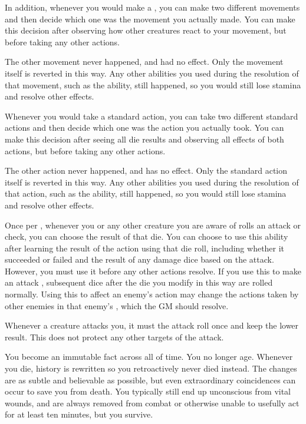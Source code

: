       In addition, whenever you would make a , you can make two different movements and then decide which one was the movement you actually made.
      You can make this decision after observing how other creatures react to your movement, but before taking any other actions.

      The other movement never happened, and had no effect.
      Only the movement itself is reverted in this way.
      Any other abilities you used during the resolution of that movement, such as the  ability, still happened, so you would still lose stamina and resolve other effects.

       Whenever you would take a standard action, you can take two different standard actions and then decide which one was the action you actually took.
      You can make this decision after seeing all die results and observing all effects of both actions, but before taking any other actions.

      The other action never happened, and has no effect.
      Only the standard action itself is reverted in this way.
      Any other abilities you used during the resolution of that action, such as the  ability, still happened, so you would still lose stamina and resolve other effects.

       Once per , whenever you or any other creature you are aware of rolls an attack or check, you can choose the result of that die.
      You can choose to use this ability after learning the result of the action using that die roll, including whether it succeeded or failed and the result of any damage dice based on the attack.
      However, you must use it before any other actions resolve.
      If you use this to make an attack , subsequent dice after the die you modify in this way are rolled normally.
      Using this to affect an enemy's action may change the actions taken by other enemies in that enemy's , which the GM should resolve.

       Whenever a creature attacks you, it must  the attack roll once and keep the lower result.
      This does not protect any other targets of the attack.

       You become an immutable fact across all of time.
      You no longer age.
      Whenever you die, history is rewritten so you retroactively never died instead.
      The changes are as subtle and believable as possible, but even extraordinary coincidences can occur to save you from death.
      You typically still end up unconscious from vital wounds, and are always removed from combat or otherwise unable to usefully act for at least ten minutes, but you survive.

